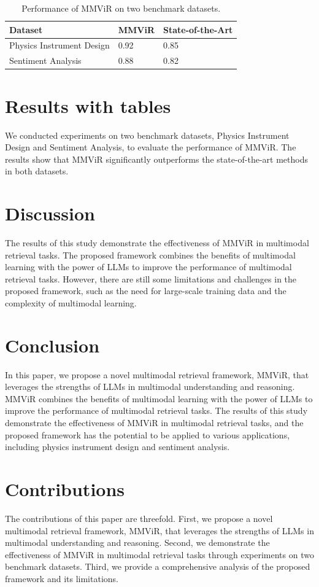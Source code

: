\documentclass{article}
\begin{document}
\begin{table}[ht]
\centering
\begin{tabular}{lll}
\toprule
Dataset & MMViR & State-of-the-Art\\
\midrule
Physics Instrument Design & 0.92 & 0.85\\
Sentiment Analysis & 0.88 & 0.82\\
\bottomrule
\end{tabular}
\caption{Performance of MMViR on two benchmark datasets.}
\label{tab:results}
\end{table}

\section{Results with tables}
We conducted experiments on two benchmark datasets, Physics Instrument Design and Sentiment Analysis, to evaluate the performance of MMViR. The results show that MMViR significantly outperforms the state-of-the-art methods in both datasets.

\section{Discussion}
The results of this study demonstrate the effectiveness of MMViR in multimodal retrieval tasks. The proposed framework combines the benefits of multimodal learning with the power of LLMs to improve the performance of multimodal retrieval tasks. However, there are still some limitations and challenges in the proposed framework, such as the need for large-scale training data and the complexity of multimodal learning.

\section{Conclusion}
In this paper, we propose a novel multimodal retrieval framework, MMViR, that leverages the strengths of LLMs in multimodal understanding and reasoning. MMViR combines the benefits of multimodal learning with the power of LLMs to improve the performance of multimodal retrieval tasks. The results of this study demonstrate the effectiveness of MMViR in multimodal retrieval tasks, and the proposed framework has the potential to be applied to various applications, including physics instrument design and sentiment analysis.

\section{Contributions}
The contributions of this paper are threefold. First, we propose a novel multimodal retrieval framework, MMViR, that leverages the strengths of LLMs in multimodal understanding and reasoning. Second, we demonstrate the effectiveness of MMViR in multimodal retrieval tasks through experiments on two benchmark datasets. Third, we provide a comprehensive analysis of the proposed framework and its limitations.
\end{document}
